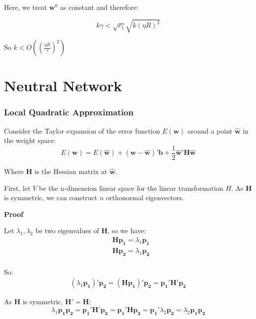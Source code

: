 \documentclass{article}
\newcommand{\V}[1]{\boldsymbol{#1}}
\begin{document}
Here, we treat \(\V{w}^0\) as constant and therefore:

\begin{equation}
k\gamma < \sqrt{c_1}\sqrt{k(\eta R)^2}
\end{equation}

So \(k<O((\frac{\eta R}{\gamma})^2)\)

\section{Neutral Network}
\subsubsection{Local Quadratic Approximation}
Consider the Taylor expansion of the error function \(E(\V{w})\) around
a point \(\hat{\V{w}}\) in the weight space:
\begin{equation}
E(\V{w})=E(\hat{\V{w}})+(\V{w}-\hat{\V{w}})'\V{b}
+\frac{1}{2}\hat{\V{w}}'\V{H}\hat{\V{w}}
\end{equation}

Where \(\V{H}\) is the Hessian matrix at \(\hat{\V{w}}\).

First, let \(V\) be the n-dimension linear space for the linear
transformation \(H\). As \(\V{H}\) is symmetric, we can construct \(n\) orthonormal eigenvectors.

\vspace{2mm}
\textbf{Proof}

Let \(\lambda_1, \lambda_2\) be two eigenvalues of \(\V{H}\), so we have:
\begin{equation}
\begin{split}
&\V{H}\V{p_1}=\lambda_1\V{p_1}\\
&\V{H}\V{p_2}=\lambda_1\V{p_2}\\
\end{split}
\end{equation}

So:
\begin{equation}
\begin{split}
(\lambda_1\V{p_1})'\V{p_2}=(\V{H}\V{p_1})'\V{p_2}
=\V{p_1}'\V{H}'\V{p_2}
\end{split}
\end{equation}

As \(\V{H}\) is symmetric, \(\V{H}'=\V{H}\):
\begin{equation}
\lambda_1\V{p_1}\V{p_2}=
\V{p_1}'\V{H}'\V{p_2}=\V{p_1}'\V{H}\V{p_2}=\V{p_1}'\lambda_2\V{p_2}
=\lambda_2\V{p_1}\V{p_2}
\end{equation}
\end{document}
